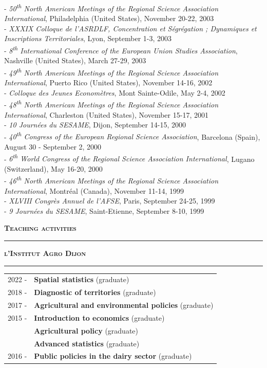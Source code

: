 \documentclass[a4paper,12pt]{article}
\newcommand{\bigtitre}[1]{%
	\begin{center}
		\textbf{\LARGE \textsc{#1}}
	\end{center}
	\bigskip
	}
\newcommand{\titre}[1]{%
	\bigskip
	\noindent \rule[2mm]{\textwidth}{0.5pt}
	\textbf{\textsc{\large #1}} \\
	\noindent \rule[1mm]{\textwidth}{0.5pt}
	}
\begin{document}
- \textit{50\textsuperscript{th} North American Meetings of the Regional Science Association International}, Philadelphia (United States), November 20-22, 2003 \\
- \textit{XXXIX\ieme{} Colloque de l'ASRDLF, Concentration et Ségrégation ; Dynamiques et Inscriptions Territoriales}, Lyon, September 1-3, 2003 \\
- \textit{8\textsuperscript{th} International Conference of the European Union Studies Association}, Nashville (United States), March 27-29, 2003 \\
- \textit{49\textsuperscript{th} North American Meetings of the Regional Science Association International}, Puerto Rico (United States), November 14-16, 2002 \\
- \textit{Colloque des Jeunes Economètres}, Mont Sainte-Odile, May 2-4, 2002 \\
- \textit{48\textsuperscript{th} North American Meetings of the Regional Science Association International}, Charleston (United States), November 15-17, 2001 \\
- \textit{10\ieme{} Journées du SESAME}, Dijon, September 14-15, 2000 \\
- \textit{40\textsuperscript{th} Congress of the European Regional Science Association}, Barcelona (Spain), August 30 - September 2, 2000 \\
- \textit{6\textsuperscript{th} World Congress of the Regional Science Association International}, Lugano (Switzerland), May 16-20, 2000 \\
- \textit{46\textsuperscript{th} North American Meetings of the Regional Science Association International}, Montréal (Canada), November 11-14, 1999 \\
- \textit{XLVIII\ieme{} Congrès Annuel de l'AFSE}, Paris, September 24-25, 1999 \\
- \textit{9\ieme{} Journées du SESAME}, Saint-Etienne, September 8-10, 1999 \\

\newpage


\bigtitre{Teaching activities}

\titre{l'Institut Agro Dijon}

\noindent \begin{longtable}{@{}p{\annee}p{\texte}@{}}
2022 -	& \textbf{Spatial statistics} (graduate) \\
2018 -	& \textbf{Diagnostic of territories} (graduate) \\
2017 -	& \textbf{Agricultural and environmental policies} (graduate) \\
2015 - 	& \textbf{Introduction to economics} (graduate) \\
		& \textbf{Agricultural policy} (graduate) \\
		& \textbf{Advanced statistics} (graduate) \\
2016 - 	& \textbf{Public policies in the dairy sector} (graduate) \\
\end{longtable}
\end{document}
